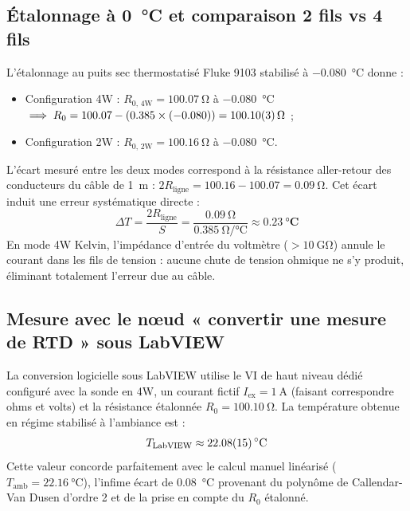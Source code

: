 \subsection{Étalonnage à \qty{0}{\degreeCelsius} et comparaison 2 fils vs 4 fils}
\label{subsec:pt100_etalonnage}

L'étalonnage au puits sec thermostatisé Fluke 9103 stabilisé à \qty{-0.080}{\degreeCelsius} donne :
\begin{itemize}[leftmargin=1.2cm,topsep=2pt,itemsep=1pt]
    \item Configuration 4W : $R_{\text{0, 4W}} = \qty{100.07}{\ohm}$ à \qty{-0.080}{\degreeCelsius} $\implies R_0 = 100.07 - (0.385 \times (-0.080)) = \mathbf{\qty{100.10 \pm 0.03}{\ohm}}$ ;
    \item Configuration 2W : $R_{\text{0, 2W}} = \qty{100.16}{\ohm}$ à \qty{-0.080}{\degreeCelsius}.
\end{itemize}
L'écart mesuré entre les deux modes correspond à la résistance aller-retour des conducteurs du câble de \qty{1}{\meter} : $2 R_{\text{ligne}} = 100.16 - 100.07 = \qty{0.09}{\ohm}$. Cet écart induit une erreur systématique directe :
\begin{equation}
    \Delta T = \frac{2 R_{\text{ligne}}}{S} = \frac{\qty{0.09}{\ohm}}{\qty{0.385}{\ohm\per\degreeCelsius}} \approx \mathbf{\qty{+0.23}{\degreeCelsius}}
\end{equation}
En mode 4W Kelvin, l'impédance d'entrée du voltmètre ($> \qty{10}{\giga\ohm}$) annule le courant dans les fils de tension : aucune chute de tension ohmique ne s'y produit, éliminant totalement l'erreur due au câble.

\subsection{Mesure avec le nœud « convertir une mesure de RTD » sous LabVIEW}
\label{subsec:pt100_labview_node}

La conversion logicielle sous LabVIEW utilise le VI de haut niveau dédié configuré avec la sonde en 4W, un courant fictif $I_{\text{ex}} = \qty{1}{\ampere}$ (faisant correspondre ohms et volts) et la résistance étalonnée $R_0 = \qty{100.10}{\ohm}$. La température obtenue en régime stabilisé à l'ambiance est :
\begin{equation}
    T_{\text{LabVIEW}} \approx \mathbf{\qty{22.08 \pm 0.15}{\degreeCelsius}}
\end{equation}
Cette valeur concorde parfaitement avec le calcul manuel linéarisé ($T_{\text{amb}} = \qty{22.16}{\degreeCelsius}$), l'infime écart de \qty{0.08}{\degreeCelsius} provenant du polynôme de Callendar-Van Dusen d'ordre 2 et de la prise en compte du $R_0$ étalonné.

